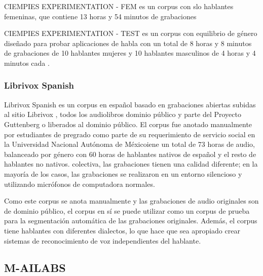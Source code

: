 CIEMPIES EXPERIMENTATION  - FEM es un corpus con slo hablantes femeninas, que contiene 13 horas y 54 minutos de grabaciones 

CIEMPIES EXPERIMENTATION  - TEST es un corpus con equilibrio de género diseñado para probar aplicaciones de habla con un total de 8 horas y 8 minutos de grabaciones de 10 hablantes mujeres y 10 hablantes masculinos de 4 horas y 4 minutos cada .

\subsubsection {Librivox Spanish}

Librivox Spanish es un corpus en español basado en grabaciones abiertas subidas al sitio Librivox \cite{LibriVox}, todos los audiolibros  dominio público y parte del Proyecto Guttenberg \cite{gutenberg} o liberados al dominio público. El corpus fue anotado manualmente por estudiantes de pregrado como parte de su requerimiento de servicio social en la Universidad Nacional Autónoma de Méxicoiene un total de 73 horas de audio, balanceado por género con 60 horas de hablantes nativos de español y el resto de hablantes no nativos.  colectiva, las grabaciones tienen una calidad diferente; en la mayoría de los casos, las grabaciones se realizaron en un entorno silencioso y utilizando micrófonos de computadora normales.

Como este corpus se anota manualmente y las grabaciones de audio originales son de dominio público, el corpus en sí se puede utilizar como un corpus de prueba para la segmentación automática de las grabaciones originales. Además, el corpus tiene hablantes con diferentes dialectos, lo que hace que sea apropiado crear sistemas de reconocimiento de voz independientes del hablante.

\subsection{M-AILABS}


